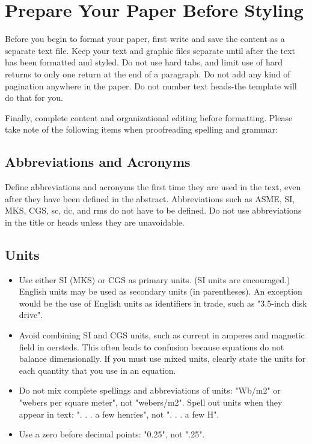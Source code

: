 \documentclass[conference]{IEEEtran}
\begin{document}
\section{Prepare Your Paper Before Styling} 
Before you begin to format your paper, first write and save the content as a separate text file. Keep your text and graphic files separate until after the text has been formatted and styled. Do not use hard tabs, and limit use of hard returns to only one return at the end of a paragraph. Do not add any kind of pagination anywhere in the paper. Do not number text heads-the template will do that for you.

Finally, complete content and organizational editing before formatting. Please take note of the following items when proofreading spelling and grammar:

\subsection{Abbreviations and Acronyms} 
Define abbreviations and acronyms the first time they are used in the text, even after they have been defined in the abstract. Abbreviations such as ASME, SI, MKS, CGS, sc, dc, and rms do not have to be defined. Do not use abbreviations in the title or heads unless they are unavoidable.

\subsection{Units} 

\begin{itemize}
	\item Use either SI (MKS) or CGS as primary units. (SI units are encouraged.) English units may be used as secondary units (in parentheses). An exception would be the use of English units as identifiers in trade, such as "3.5-inch disk drive". 
	
	\item Avoid combining SI and CGS units, such as current in amperes and magnetic field in oersteds. This often leads to confusion because equations do not balance dimensionally. If you must use mixed units, clearly state the units for each quantity that you use in an equation.
	
	\item Do not mix complete spellings and abbreviations of units: "Wb/m2" or "webers per square meter", not "webers/m2".  Spell out units when they appear in text: ". . . a few henries", not ". . . a few H".
	
	\item Use a zero before decimal points: "0.25", not ".25".
\end{itemize}
\end{document}
